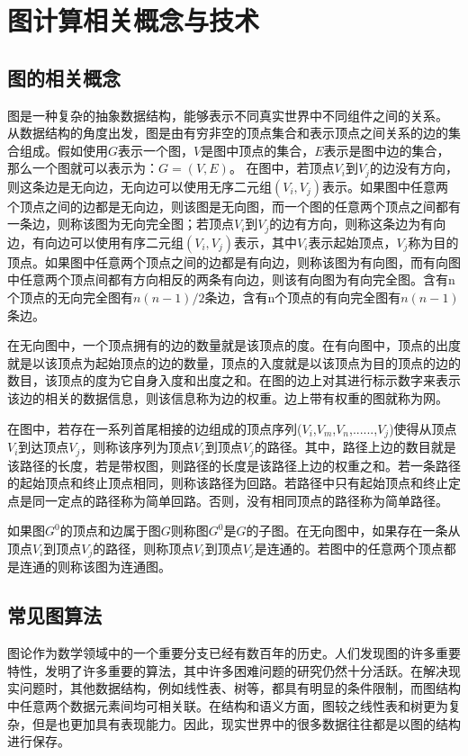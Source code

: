 
\chapter{图计算相关概念与技术}

\section{图的相关概念}
图是一种复杂的抽象数据结构，能够表示不同真实世界中不同组件之间的关系\cite{sunhuiquan2004}。
从数据结构的角度出发，图是由有穷非空的顶点集合和表示顶点之间关系的边的集合组成。假如使用$G$表示一个图，$V$是图中顶点的集合，$E$表示是图中边的集合，那么一个图就可以表示为：$G=(V,E)$。
在图中，若顶点$V_i$到$V_j$的边没有方向，则这条边是无向边，无向边可以使用无序二元组$(V_i,V_j)$表示。如果图中任意两个顶点之间的边都是无向边，则该图是无向图，而一个图的任意两个顶点之间都有一条边，则称该图为无向完全图；若顶点$V_i$到$V_j$的边有方向，则称这条边为有向边，有向边可以使用有序二元组$(V_i,V_j)$表示，其中$V_i$表示起始顶点，$V_j$称为目的顶点。如果图中任意两个顶点之间的边都是有向边，则称该图为有向图，而有向图中任意两个顶点间都有方向相反的两条有向边，则该有向图为有向完全图。含有n个顶点的无向完全图有$n(n-1)/2$条边，含有n个顶点的有向完全图有$n(n-1)$条边。

在无向图中，一个顶点拥有的边的数量就是该顶点的度。在有向图中，顶点的出度就是以该顶点为起始顶点的边的数量，顶点的入度就是以该顶点为目的顶点的边的数目，该顶点的度为它自身入度和出度之和。在图的边上对其进行标示数字来表示该边的相关的数据信息，则该信息称为边的权重。边上带有权重的图就称为网。

在图中，若存在一系列首尾相接的边组成的顶点序列($V_i$,$V_m$,$V_n$,......,$V_j$)使得从顶点$V_i$到达顶点$V_j$，则称该序列为顶点$V_i$到顶点$V_j$的路径。其中，路径上边的数目就是该路径的长度，若是带权图，则路径的长度是该路径上边的权重之和。若一条路径的起始顶点和终止顶点相同，则称该路径为回路。若路径中只有起始顶点和终止定点是同一定点的路径称为简单回路。否则，没有相同顶点的路径称为简单路径。

如果图$G^0$的顶点和边属于图$G$则称图$G^0$是$G$的子图。在无向图中，如果存在一条从顶点$V_i$到顶点$V_j$的路径，则称顶点$V_i$到顶点$V_j$是连通的。若图中的任意两个顶点都是连通的则称该图为连通图。


\section{常见图算法}
图论作为数学领域中的一个重要分支已经有数百年的历史。人们发现图的许多重要特性，发明了许多重要的算法，其中许多困难问题的研究仍然十分活跃。在解决现实问题时，其他数据结构，例如线性表、树等，都具有明显的条件限制，而图结构中任意两个数据元素间均可相关联。在结构和语义方面，图较之线性表和树更为复杂，但是也更加具有表现能力。因此，现实世界中的很多数据往往都是以图的结构进行保存。

